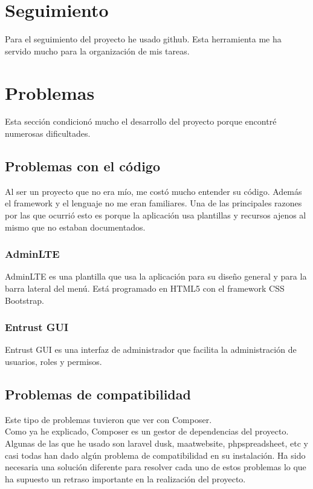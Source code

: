 \section{Seguimiento}
Para el seguimiento del proyecto he usado github. Esta herramienta me ha servido mucho para la organización de mis tareas.
\section{Problemas}
Esta sección condicionó mucho el desarrollo del proyecto porque encontré numerosas dificultades.
\subsection{Problemas con el código}
Al ser un proyecto que no era mío, me costó mucho entender su código. Además el framework y el lenguaje no me eran familiares. Una de las principales razones por las que ocurrió esto es porque la aplicación usa plantillas y recursos ajenos al mismo que no estaban documentados.
\subsubsection{AdminLTE}
AdminLTE es una plantilla que usa la aplicación para su diseño general y para la barra lateral del menú. Está programado en HTML5 con el framework CSS Bootstrap. 
\subsubsection{Entrust GUI}
Entrust GUI es una interfaz de administrador que facilita la administración de usuarios, roles y permisos.
\subsection{Problemas de compatibilidad}
Este tipo de problemas tuvieron que ver con Composer.\\
Como ya he explicado, Composer es un gestor de dependencias del proyecto. Algunas de las que he usado son laravel dusk, maatwebsite, phpspreadsheet, etc y casi todas han dado algún problema de compatibilidad en su instalación.
Ha sido necesaria una solución diferente para resolver cada uno de estos problemas lo que ha supuesto un retraso importante en la realización del proyecto.
